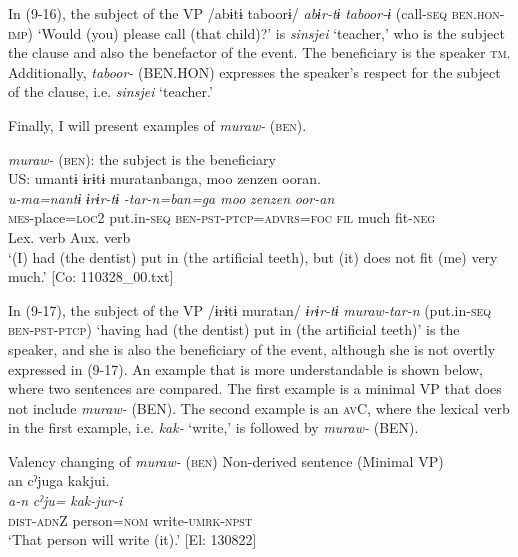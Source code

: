 In (9-16), the subject of the VP /abɨtɨ taboorɨ/ \textit{abɨr-tɨ} \textit{taboor-ɨ} (call-\textsc{seq} \textsc{ben}.\textsc{hon}-\textsc{imp}) ‘Would (you) please call (that child)?’ is \textit{sinsjei} ‘teacher,’ who is the subject the clause and also the benefactor of the event. The beneficiary is the speaker \textsc{tm}. Additionally, \textit{taboor-} (BEN.HON) expresses the speaker’s respect for the subject of the clause, i.e. \textit{sinsjei} ‘teacher.’

Finally, I will present examples of \textit{muraw-} (\textsc{ben}).

\ea   \textit{muraw-} (\textsc{ben}): the subject is the beneficiary\label{ex:9.17}\\
\gllll  US:  umantɨ  ɨrɨtɨ  muratanbanga,  {\textbar}moo  zenzen{\textbar}  ooran.    \\
    \textit{u-ma=nantɨ}  \textit{ɨrɨr-tɨ}  \textit{-tar-n=ban=ga  moo}   \textit{zenzen}  \textit{oor-an}    \\
    \textsc{mes}-place=\textsc{loc}2  put.in-\textsc{seq}  \textsc{ben}-\textsc{pst}-\textsc{ptcp}=\textsc{advrs}=\textsc{foc}  \textsc{fil}   much  fit-\textsc{neg}    \\
      Lex. verb  Aux. verb     \\
    \glt     ‘(I) had (the dentist) put in (the artificial teeth), but (it) does not fit (me) very much.’ [Co: 110328\_00.txt]
\z

In (9-17), the subject of the VP /ɨrɨtɨ muratan/ \textit{ɨrɨr-tɨ} \textit{muraw-tar-n} (put.in-\textsc{seq} \textsc{ben}-\textsc{pst}-\textsc{ptcp}) ‘having had (the dentist) put in (the artificial teeth)’ is the speaker, and she is also the beneficiary of the event, although she is not overtly expressed in (9-17). An example that is more understandable is shown below, where two sentences are compared. The first example is a minimal VP that does not include \textit{muraw-} (BEN). The second example is an \textsc{av}C, where the lexical verb in the first example, i.e. \textit{kak-} ‘write,’ is followed by \textit{muraw-} (BEN).

\ea   Valency changing of \textit{muraw-} (\textsc{ben}) \label{ex:9.18}
  \ea Non-derived sentence (Minimal VP)\label{ex:9.18a}\\
\glll     an  cˀjuga  kakjui.\\
      \textit{a-n}  \textit{cˀju=}  \textit{kak-jur-i}\\
      \textsc{dist}-\textsc{adn}Z  person=\textsc{nom}  write-\textsc{umrk}-\textsc{npst}\\
      \glt       ‘That person will write (it).’ [El: 130822]

